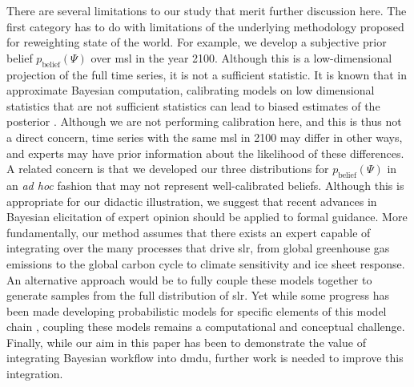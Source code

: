 \documentclass[11pt]{article}
\makeatletter
\DeclareRobustCommand\onedot{\futurelet\@let@token\@onedot}
\def\@onedot{\ifx\@let@token.\else.\null\fi\xspace}
\def\eg{\emph{e.g}\onedot} \def\Eg{\emph{E.g}\onedot}
\DeclareRobustCommand\onedot{\futurelet\@let@token\@onedot}
\def\@onedot{\ifx\@let@token.\else.\null\fi\xspace}
\def\eg{\emph{e.g}\onedot} \def\Eg{\emph{E.g}\onedot}
\makeatother
\begin{document}
There are several limitations to our study that merit further discussion here.
The first category has to do with limitations of the underlying methodology proposed for reweighting state of the world.
For example, we develop a subjective prior belief $p_\mathrm{belief}(\Psi)$ over \gls{msl} in the year 2100.
Although this is a low-dimensional projection of the full time series, it is not a sufficient statistic.
It is known that in approximate Bayesian computation, calibrating models on low dimensional statistics that are not sufficient statistics can lead to biased estimates of the posterior \citep{csillery_abc:2010,marjoram_abc:2006}.
Although we are not performing calibration here, and this is thus not a direct concern, time series with the same \gls{msl} in 2100 may differ in other ways, and experts may have prior information about the likelihood of these differences.
A related concern is that we developed our three distributions for $p_\mathrm{belief}(\Psi)$  in an \emph{ad hoc} fashion that may not represent well-calibrated beliefs.
Although this is appropriate for our didactic illustration, we suggest that recent advances in Bayesian elicitation of expert opinion \citep[see][and references therein]{mikkola_elicitation:2021} should be applied to formal guidance.
More fundamentally, our method assumes that there exists an expert capable of integrating over the many processes that drive \gls{slr}, from global greenhouse gas emissions to the global carbon cycle to climate sensitivity and ice sheet response.
An alternative approach would be to fully couple these models together to generate samples from the full distribution of \gls{slr}.
Yet while some progress has been made developing probabilistic models for specific elements of this model chain \citep[\eg,][]{srikrishnan_probabilistic:2022}, coupling these models remains a computational and conceptual challenge.
Finally, while our aim in this paper has been to demonstrate the value of integrating Bayesian workflow \citep{gelman_workflow:2020} into \gls{dmdu}, further work is needed to improve this integration.
\end{document}
